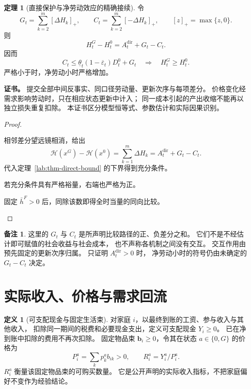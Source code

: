 \documentclass[UTF8,12pt,a4paper,openany,fontset=none,zihao=false]{ctexrep}
\theoremstyle{definition}
\newtheorem{definition}{定义}[chapter]
\newtheorem{theorem}{定理}[chapter]
\newtheorem{remark}{备注}[chapter]
\newenvironment{certificate}{\par\noindent\textbf{证书。}\ignorespaces}{\par}
\newcommand{\1}{\mathbf 1}
\begin{document}
\begin{theorem}[直接保护与净劳动效应的精确接续]
\label{lab:thm-net-effects}
令
\[
 G_t=\sum_{k=2}^{m}[\Delta H_k]_+,\qquad
 C_t=\sum_{k=2}^{m}[-\Delta H_k]_+,\qquad
 [z]_+=\max\{z,0\}.
\]
则
\[
 H_t^G-H_t^0=A_t^{\mathrm{dir}}+G_t-C_t.
\]
因而
\[
 C_t\le
 \underline\theta_t(1-\overline\varepsilon_t)D_t^0+G_t
 \quad\Longrightarrow\quad H_t^G\ge H_t^0.
\]
严格小于时，净劳动小时严格增加。
\end{theorem}
\begin{certificate}
提交全部中间反事实、同口径劳动量、更新次序与每项差分。
价格变化经需求影响劳动时，只在相应状态更新中计入；
同一成本引起的产出收缩不能再以独立损失重复扣除。
本证书区分模型恒等式、参数估计和实际因果识别。
\end{certificate}
\begin{proof}
\begin{semanticsteps}
\item 相邻差分望远镜相消，给出
\[
 \mathcal H(x^G)-\mathcal H(x^0)
 =\sum_{k=1}^{m}\Delta H_k
 =A_t^{\mathrm{dir}}+G_t-C_t.
\]
代入定理~\ref{lab:thm-direct-bound} 的下界得到充分条件。
\item 若充分条件具有严格裕量，右端也严格为正。
\item 固定 \(\bar h^{F}>0\) 后，同除该数即得全时当量的同向比较。
\end{semanticsteps}
\end{proof}

\begin{remark}
这里的 \(G_t\) 与 \(C_t\) 是所声明比较路径的正、负差分之和。
它们不是不经估计即可赋值的社会收益与社会成本，
也不声称各机制之间没有交互。
交互作用由预先固定的更新次序归属。
只证明 \(A_t^{\mathrm{dir}}>0\) 时，
净劳动小时的符号仍由未确定的 \(G_t-C_t\) 决定。
\end{remark}

\section{实际收入、价格与需求回流}

\begin{definition}[可支配现金与固定生活束]
\label{lab:def-real-income}
对家庭 \(i\)，以最终到账的工资、参与收入与其他收入，
扣除同一期间的税费和必要现金支出，定义可支配现金 \(Y_i\ge0\)。
已在净到账中扣除的费用不再次扣除。
固定物品束 \(\mathbf b_i\ge0\)，令其在状态 \(a\in\{0,G\}\) 的价格为
\[
 P_i^a=\sum_k p_k^a b_{ik}>0,\qquad
 R_i^a=Y_i^a/P_i^a.
\]
\(R_i^a\) 衡量该固定物品束的可购买数量。
它是公开声明的实际收入指标，不把家庭偏好不变作为经验结论。
\end{definition}
\end{document}
